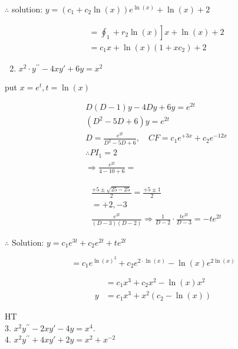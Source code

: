 \documentclass[12pt, a4paper]{article}
\begin{document}
	$\therefore$ solution: $y=\left(c_{1}+c_{2} \ln (x)\right) e^{\ln (x)}+\ln (x)+2$

$$
\begin{aligned}
	 & \left.=\oint_{1}+r_{2} \ln (x)\right] x+\ln (x)+2 \\
	 & =c_{1} x+\ln (x)\left(1+x c_{2}\right)+2
\end{aligned}
$$

	\begin{enumerate}
		\setcounter{enumi}{1}
		\item $x^2 \cdot y^{\prime \prime}-4 x y'+6 y=x^2 $
	\end{enumerate}

	put $x=e^{t}, t=\ln (x)$

$$
\begin{aligned}
	 & D(D-1) y-4 D y+6 y=e^{2 t}                                              \\
	 & \left(D^{2}-5 D+6\right) y=e^{2 t}                                      \\
	 & D=\frac{e^{2 t}}{D^{2}-5 D+6}, \quad C F=c_{1} e^{+3 x}+c_{2} e^{-12 x} \\
	 & \therefore P I_{1}=2                                                    \\
	 & \Rightarrow \frac{e^{2 t}}{4-10+6}=
\end{aligned}
$$

$$
\begin{aligned}
	 & \frac{+5 \pm \sqrt{25-25}}{2}=\frac{+5 \pm 1}{2}                                            \\
	 & =+2,-3                                                                                      \\
	 & \frac{e^{2 t}}{(D-3)(D-2)} \Rightarrow \frac{1}{D-2} \cdot \frac{t e^{2 t}}{D-3}=-t e^{2 t}
\end{aligned}
$$

	$\therefore$ Solution: $y=c_{1} e^{3 t}+c_{2} e^{2 t}+t e^{2 t}$

$$
=c_{1} e^{\ln (x)^{2}}+c_{2} e^{2 \cdot \ln (x)}-\ln (x) e^{2 \ln (x)}
$$

$$
\begin{aligned}
	  & =c_{1} x^{3}+c_{2} x^2 -\ln (x) x^2         \\
	y & =c_{1} x^{3}+x^2 \left(c_{2}-\ln (x)\right)
\end{aligned}
$$

	HT\\
	3. $x^2 y^{\prime \prime}-2 x y'-4 y=x^{4}$.\\
	4. $x^2 y^{\prime \prime}+4 x y'+2 y=x^2 +x^{-2}$
\end{document}
